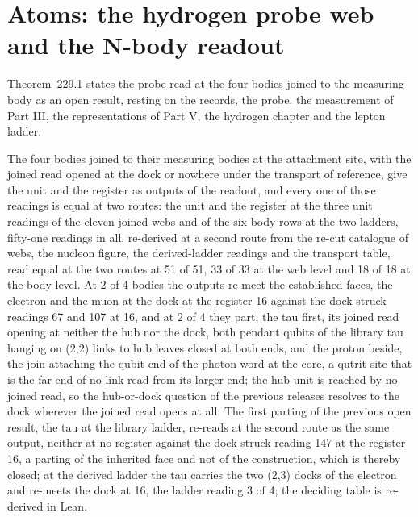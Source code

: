 \section{Atoms: the hydrogen probe web and the N-body readout}\label{mod:XII-6-atoms-the-hydrogen-probe-web-and-the-n-body-readout}
\label{narr:open:12-6}Theorem~229.1 states the probe read at the four bodies joined to the measuring body as an open result, resting on the records, the probe, the measurement of Part III, the representations of Part V, the hydrogen chapter and the lepton ladder.
\begin{chtheorem}\label{box:XII-6-atoms-the-hydrogen-probe-web-and-the-n-body-readout:1}
The four bodies joined to their measuring bodies at the attachment site, with the joined read opened at the dock or nowhere under the transport of reference, give the unit and the register as outputs of the readout, and every one of those readings is equal at two routes: the unit and the register at the three unit readings of the eleven joined webs and of the six body rows at the two ladders, fifty-one readings in all, re-derived at a second route from the re-cut catalogue of webs, the nucleon figure, the derived-ladder readings and the transport table, read equal at the two routes at 51 of 51, 33 of 33 at the web level and 18 of 18 at the body level. At 2 of 4 bodies the outputs re-meet the established faces, the electron and the muon at the dock at the register 16 against the dock-struck readings 67 and 107 at 16, and at 2 of 4 they part, the tau first, its joined read opening at neither the hub nor the dock, both pendant qubits of the library tau hanging on (2,2) links to hub leaves closed at both ends, and the proton beside, the join attaching the qubit end of the photon word at the core, a qutrit site that is the far end of no link read from its larger end; the hub unit is reached by no joined read, so the hub-or-dock question of the previous releases resolves to the dock wherever the joined read opens at all. The first parting of the previous open result, the tau at the library ladder, re-reads at the second route as the same output, neither at no register against the dock-struck reading 147 at the register 16, a parting of the inherited face and not of the construction, which is thereby closed; at the derived ladder the tau carries the two (2,3) docks of the electron and re-meets the dock at 16, the ladder reading 3 of 4; the deciding table is re-derived in Lean.
\end{chtheorem}
